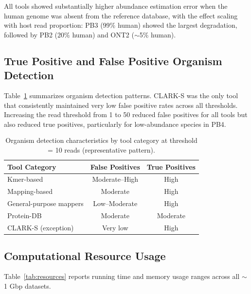 \documentclass[11pt]{article}
\begin{document}
All tools showed substantially higher abundance estimation error when the human genome was absent from the reference database, with the effect scaling with host read proportion: PB3 (99\% human) showed the largest degradation, followed by PB2 (20\% human) and ONT2 ($\sim$5\% human).

\subsection{True Positive and False Positive Organism Detection}

Table~\ref{tab:tpfp} summarizes organism detection patterns.  CLARK-S was the only tool that consistently maintained very low false positive rates across all thresholds.  Increasing the read threshold from 1 to 50 reduced false positives for all tools but also reduced true positives, particularly for low-abundance species in PB4.

\begin{table}[ht]
\centering
\caption{Organism detection characteristics by tool category at threshold = 10 reads (representative pattern).}
\label{tab:tpfp}
\begin{tabular}{@{}lcc@{}}
\toprule
Tool Category & False Positives & True Positives \\
\midrule
Kmer-based & Moderate--High & High \\
Mapping-based & Moderate & High \\
General-purpose mappers & Low--Moderate & High \\
Protein-DB & Moderate & Moderate \\
CLARK-S (exception) & Very low & High \\
\bottomrule
\end{tabular}
\end{table}

\subsection{Computational Resource Usage}

Table~\ref{tab:resources} reports running time and memory usage ranges across all $\sim$1 Gbp datasets.
\end{document}

